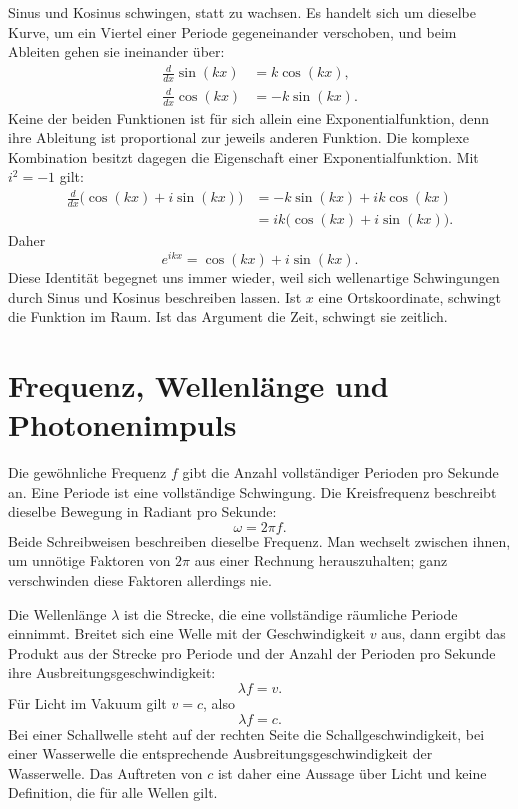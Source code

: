 Sinus und Kosinus schwingen, statt zu wachsen. Es handelt sich um dieselbe Kurve, um ein Viertel einer Periode gegeneinander verschoben, und beim Ableiten gehen sie ineinander über:
\begin{align}
\frac{d}{dx}\sin(kx)&=k\cos(kx),\\
\frac{d}{dx}\cos(kx)&=-k\sin(kx).
\end{align}
Keine der beiden Funktionen ist für sich allein eine Exponentialfunktion, denn ihre Ableitung ist proportional zur jeweils anderen Funktion. Die komplexe Kombination besitzt dagegen die Eigenschaft einer Exponentialfunktion. Mit \(i^2=-1\) gilt:
\begin{align}
\frac{d}{dx}\bigl(\cos(kx)+i\sin(kx)\bigr)
&=-k\sin(kx)+ik\cos(kx)\\
&=ik\bigl(\cos(kx)+i\sin(kx)\bigr).
\end{align}
Daher
\begin{equation}
e^{ikx}=\cos(kx)+i\sin(kx).
\end{equation}
Diese Identität begegnet uns immer wieder, weil sich wellenartige Schwingungen durch Sinus und Kosinus beschreiben lassen. Ist \(x\) eine Ortskoordinate, schwingt die Funktion im Raum. Ist das Argument die Zeit, schwingt sie zeitlich.

\section{Frequenz, Wellenlänge und Photonenimpuls}

Die gewöhnliche Frequenz \(f\) gibt die Anzahl vollständiger Perioden pro Sekunde an. Eine Periode ist eine vollständige Schwingung. Die Kreisfrequenz beschreibt dieselbe Bewegung in Radiant pro Sekunde:
\begin{equation}
\omega=2\pi f.
\end{equation}
Beide Schreibweisen beschreiben dieselbe Frequenz. Man wechselt zwischen ihnen, um unnötige Faktoren von \(2\pi\) aus einer Rechnung herauszuhalten; ganz verschwinden diese Faktoren allerdings nie.

Die Wellenlänge \(\lambda\) ist die Strecke, die eine vollständige räumliche Periode einnimmt. Breitet sich eine Welle mit der Geschwindigkeit \(v\) aus, dann ergibt das Produkt aus der Strecke pro Periode und der Anzahl der Perioden pro Sekunde ihre Ausbreitungsgeschwindigkeit:
\begin{equation}
\lambda f=v.
\end{equation}
Für Licht im Vakuum gilt \(v=c\), also
\begin{equation}
\lambda f=c.
\end{equation}
Bei einer Schallwelle steht auf der rechten Seite die Schallgeschwindigkeit, bei einer Wasserwelle die entsprechende Ausbreitungsgeschwindigkeit der Wasserwelle. Das Auftreten von \(c\) ist daher eine Aussage über Licht und keine Definition, die für alle Wellen gilt.

